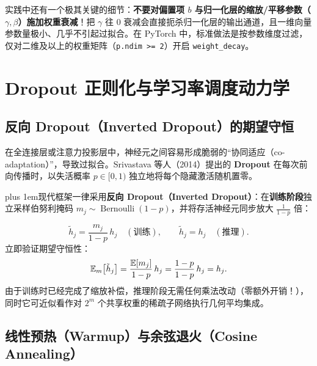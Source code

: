 实践中还有一个极其关键的细节：\textbf{不要对偏置项 $b$ 与归一化层的缩放/平移参数（$\gamma, \beta$）施加权重衰减}！把 $\gamma$ 往 $0$ 衰减会直接扼杀归一化层的输出通道，且一维向量参数量极小、几乎不引起过拟合。在 PyTorch 中，标准做法是按参数维度过滤，仅对二维及以上的权重矩阵（\texttt{p.ndim >= 2}）开启 \texttt{weight\_decay}。

\section{Dropout 正则化与学习率调度动力学}
\label{sec:dropout-lr}

\subsection{反向 Dropout（Inverted Dropout）的期望守恒}

在全连接层或注意力投影层中，神经元之间容易形成脆弱的“协同适应（co-adaptation）”，导致过拟合。Srivastava 等人（2014）提出的 \textbf{Dropout} 在每次前向传播时，以失活概率 $p \in [0, 1)$ 独立地将每个隐藏激活随机置零。

{\rightskip=0pt plus 1em\relax 现代框架一律采用\textbf{反向 Dropout（Inverted Dropout）}：在\textbf{训练阶段}独立采样伯努利掩码 $m_j \sim \operatorname{Bernoulli}(1 - p)$，并将存活神经元同步放大 $\frac{1}{1-p}$ 倍：\par}
\begin{equation}
  \tilde{h}_j = \frac{m_j}{1 - p}\, h_j \quad (\text{训练}), \qquad
  \tilde{h}_j = h_j \quad (\text{推理}).
  \label{eq:inv-dropout}
\end{equation}
立即验证期望守恒性：
\[
  \mathbb{E}_m\!\left[\tilde{h}_j\right] = \frac{\mathbb{E}[m_j]}{1 - p}\, h_j = \frac{1 - p}{1 - p}\, h_j = h_j.
\]
由于训练时已经完成了缩放补偿，推理阶段无需任何乘法改动（零额外开销！），同时它可近似看作对 $2^m$ 个共享权重的稀疏子网络执行几何平均集成。

\subsection{线性预热（Warmup）与余弦退火（Cosine Annealing）}

